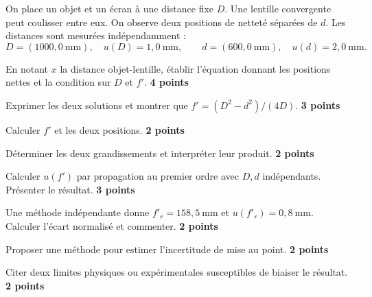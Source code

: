 \label{ch01-ex-DM}
On place un objet et un écran à une distance fixe $D$. Une lentille convergente peut coulisser entre eux. On observe deux positions de netteté séparées de $d$. Les distances sont mesurées indépendamment :
\[D=(1000{,}0\ \mathrm{mm}),\quad u(D)=1{,}0\ \mathrm{mm},\qquad
d=(600{,}0\ \mathrm{mm}),\quad u(d)=2{,}0\ \mathrm{mm}.\]
\begin{questions}
\item En notant $x$ la distance objet-lentille, établir l'équation donnant les positions nettes et la condition sur $D$ et $f'$. \textbf{4 points}
\item Exprimer les deux solutions et montrer que $f'=(D^2-d^2)/(4D)$. \textbf{3 points}
\item Calculer $f'$ et les deux positions. \textbf{2 points}
\item Déterminer les deux grandissements et interpréter leur produit. \textbf{2 points}
\item Calculer $u(f')$ par propagation au premier ordre avec $D,d$ indépendants. Présenter le résultat. \textbf{3 points}
\item Une méthode indépendante donne $f'_r=158{,}5\ \mathrm{mm}$ et $u(f'_r)=0{,}8\ \mathrm{mm}$. Calculer l'écart normalisé et commenter. \textbf{2 points}
\item Proposer une méthode pour estimer l'incertitude de mise au point. \textbf{2 points}
\item Citer deux limites physiques ou expérimentales susceptibles de biaiser le résultat. \textbf{2 points}
\end{questions}

